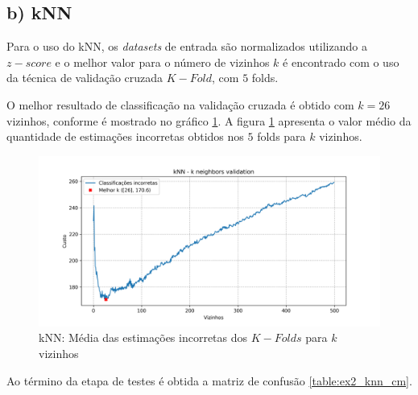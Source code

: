 \documentclass{article}
\begin{document}
    \subsection[]{b) kNN}
    Para o uso do kNN, os \textit{datasets} de entrada são normalizados utilizando a $z-score$ e o melhor valor para o número de 
    vizinhos $k$ é encontrado com o uso da técnica de validação cruzada $K-Fold$, com $5$ folds. 

    O melhor resultado de classificação na validação cruzada é obtido com $k=26$ vizinhos, conforme é mostrado no gráfico \ref{fig:ex2_b_knn}.
    A figura \ref{fig:ex2_b_knn} apresenta o valor médio da quantidade de estimações incorretas obtidos nos $5$ folds para $k$ vizinhos.
    \begin{figure}[H]
        \centering
        \includegraphics[width=.8\linewidth]{img2/knn.png}
        \caption{kNN: Média das estimações incorretas dos $K-Folds$ para $k$ vizinhos}
        \label{fig:ex2_b_knn}
    \end{figure}

    Ao término da etapa de testes é obtida a matriz de confusão \ref{table:ex2_knn_cm}.
\end{document}
